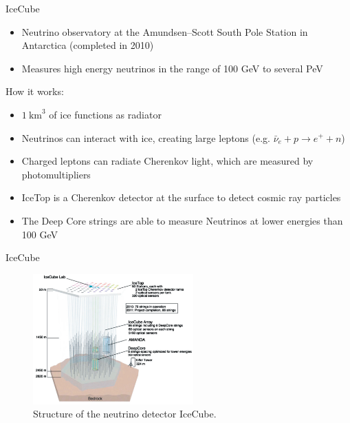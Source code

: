 \documentclass[aspectratio=1610, 10pt]{beamer}
\begin{document}
\begin{frame}{IceCube}
  \begin{itemize}
    \item Neutrino observatory at the Amundsen–Scott South Pole Station in Antarctica (completed in 2010)
    \medskip
    \item Measures high energy neutrinos in the range of 100 GeV to several PeV
  \end{itemize}
\vspace{0.5cm}
  How it works:
  \begin{itemize}
    \item $1 \: \mathrm{km}^3$ of ice functions as radiator
    \medskip
    \item Neutrinos can interact with ice, creating large leptons (e.g. $\bar{\nu}_e + p \rightarrow e^{+} + n$)
    \medskip
    \item Charged leptons can radiate Cherenkov light, which are measured by photomultipliers
    \medskip
    \item IceTop is a Cherenkov detector at the surface to detect cosmic ray particles
    \medskip
    \item The Deep Core strings are able to measure Neutrinos at lower energies than 100 GeV
  \end{itemize}
\end{frame}

\begin{frame}{IceCube}
  \begin{figure}
    \includegraphics[width=0.55\textwidth]{images/icecube.png}
    \caption{Structure of the neutrino detector IceCube.}
  \end{figure}
\end{frame}
\end{document}
